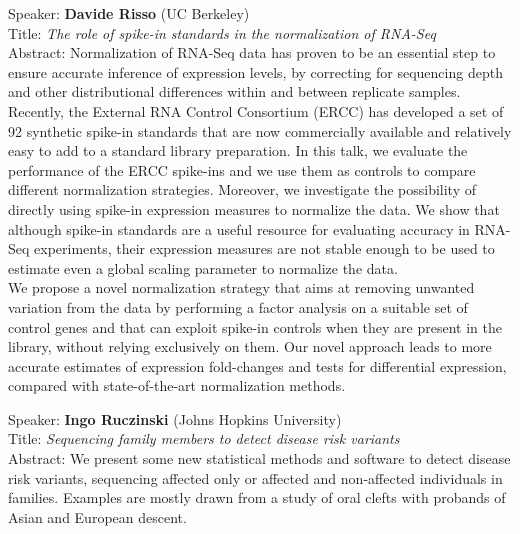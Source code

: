 \documentclass[11pt]{article}
\begin{document}
\bigskip
\noindent
Speaker: {\bf Davide Risso} (UC Berkeley)\\
Title: {\it The role of spike-in standards in the normalization of RNA-Seq}\\
Abstract: Normalization of RNA-Seq data has proven to be an essential step to
ensure accurate inference of expression levels, by correcting for
sequencing depth and other distributional differences within and
between replicate samples. Recently, the External RNA Control
Consortium (ERCC) has developed a set of 92 synthetic spike-in
standards that are now commercially available and relatively easy to
add to a standard library preparation.
In this talk, we evaluate the performance of the ERCC spike-ins and we
use them as controls to compare different normalization strategies.
Moreover, we investigate the possibility of directly using spike-in
expression measures to normalize the data. We show that although
spike-in standards are a useful resource for evaluating accuracy in
RNA-Seq experiments, their expression measures are not stable enough
to be used to estimate even a global scaling parameter to normalize
the data.\\

\noindent We propose a novel normalization strategy that aims at removing
unwanted variation from the data by performing a factor analysis on a
suitable set of control genes and that can exploit spike-in controls
when they are present in the library, without relying exclusively on
them. Our novel approach leads to more accurate estimates of
expression fold-changes and tests for differential expression,
compared with state-of-the-art normalization methods.

\bigskip
\noindent
Speaker: {\bf Ingo Ruczinski} (Johns Hopkins University)\\
Title: {\it Sequencing family members to detect disease risk variants}\\
Abstract: We present some new statistical methods and software to
detect disease risk variants, sequencing affected only or affected and
non-affected individuals in families. Examples are mostly drawn from a
study of oral clefts with probands of Asian and European descent.
\end{document}
